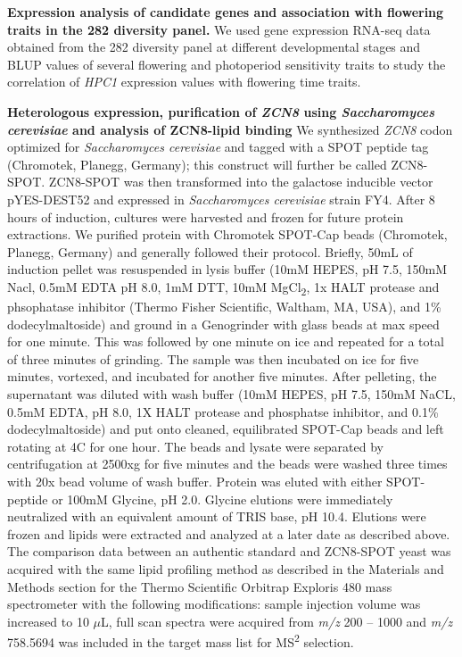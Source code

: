 \documentclass[9pt,twocolumn,twoside,lineno]{biorxiv}
\newcommand{\hpc}{\textit{HPC1}\xspace}
\begin{document}
\textbf{Expression analysis of candidate genes and association with flowering traits in the 282 diversity panel.}
We used gene expression RNA-seq data obtained from the 282 diversity panel at different developmental stages \cite{Kremling2018-gn} and BLUP values of several flowering and photoperiod sensitivity traits \cite{Hung2012-ms} to study the correlation of \hpc expression values with flowering time traits.  

\textbf{Heterologous expression, purification of \textit{ZCN8} using \textit{Saccharomyces cerevisiae} and analysis of ZCN8-lipid binding}
We synthesized \textit{ZCN8} codon optimized for \textit{Saccharomyces cerevisiae} and tagged with a SPOT peptide tag (Chromotek, Planegg, Germany); this construct will further be called ZCN8-SPOT. 
ZCN8-SPOT was then transformed into the galactose inducible vector pYES-DEST52 and expressed in \textit{Saccharomyces cerevisiae} strain FY4. 
After 8 hours of induction, cultures were harvested and frozen for future protein extractions. 
We purified protein with Chromotek SPOT-Cap beads (Chromotek, Planegg, Germany) and generally followed their protocol. 
Briefly, 50mL of induction pellet was resuspended in lysis buffer (10mM HEPES, pH 7.5, 150mM Nacl, 0.5mM EDTA pH 8.0, 1mM DTT, 10mM MgCl\textsubscript{2}, 1x HALT protease and phsophatase inhibitor (Thermo Fisher Scientific, Waltham, MA, USA), and 1\% dodecylmaltoside) and ground in a Genogrinder with glass beads at max speed for one minute.
This was followed by one minute on ice and repeated for a total of three minutes of grinding.
The sample was then incubated on ice for five minutes, vortexed, and incubated for another five minutes. 
After pelleting, the supernatant was diluted with wash buffer (10mM HEPES, pH 7.5, 150mM NaCL, 0.5mM EDTA, pH 8.0, 1X HALT protease and phosphatse inhibitor, and 0.1\% dodecylmaltoside) and put onto cleaned, equilibrated SPOT-Cap beads and left rotating at 4\textdegree C for one hour.
The beads and lysate were separated by centrifugation at 2500xg for five minutes and the beads were washed three times with 20x bead volume of wash buffer. 
Protein was eluted with either SPOT-peptide or 100mM Glycine, pH 2.0. 
Glycine elutions were immediately neutralized with an equivalent amount of TRIS base, pH 10.4.
Elutions were frozen and lipids were extracted and analyzed at a later date as described above. 
The comparison data between an authentic standard and ZCN8-SPOT yeast was acquired with the same lipid profiling method as described in the Materials and Methods section for the Thermo Scientific Orbitrap Exploris 480 mass spectrometer with the following modifications: sample injection volume was increased to 10 $\mu$L, full scan spectra were acquired from \emph{m/z} 200 – 1000 and \emph{m/z} 758.5694 was included in the target mass list for MS\textsuperscript{2} selection.
\end{document}
